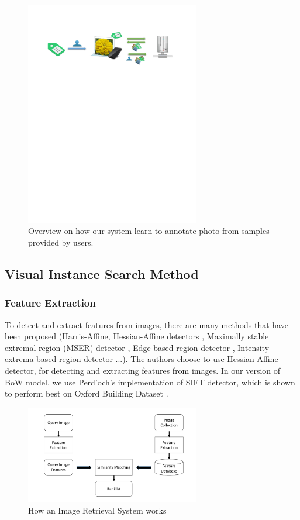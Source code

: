\begin{figure}
    \centering
    \includegraphics[width=3.0in]{flow2.pdf}
    \caption{Overview on how our system learn to annotate photo from samples provided by users.}
    \label{fig:flow_2}
\end{figure}

\subsection{Visual Instance Search Method} \label{section:visual_search}
\subsubsection{Feature Extraction} \label{section:feature_extraction}

To detect and extract features from images, there are many methods that have been proposed (Harris-Affine, Hessian-Affine detectors \cite{Mikolajczyk2004}, Maximally stable extremal region (MSER) detector \cite{conf/bmvc/MatasCUP02}, Edge-based region detector \cite{Tuytelaars99content-basedimage}, Intensity extrema-based region detector \cite{Tuytelaars00widebaseline} ...). The authors choose to use Hessian-Affine detector, for detecting and extracting features from images. In our version of BoW model, we use Perd'och's implementation of SIFT detector, which is shown to perform best on Oxford Building Dataset \cite{perdoch}.

\begin{figure}
    \centering
    \includegraphics[width=3.0in]{ImageRetrievalSystem.pdf}
    \caption{How an Image Retrieval System works}
    \label{fig:image_retrieval_system}
\end{figure}

